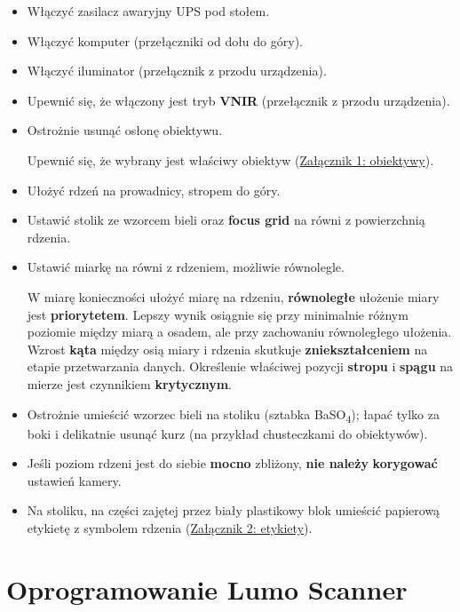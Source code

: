 \documentclass[
  letterpaper,
  DIV=11,
  numbers=noendperiod]{scrreprt}
\begin{document}
\begin{itemize}
\item
  Włączyć zasilacz awaryjny UPS pod stołem.
\item
  Włączyć komputer (przełączniki od dołu do góry).
\item
  Włączyć iluminator (przełącznik z przodu urządzenia).
\item
  Upewnić się, że włączony jest tryb \textbf{VNIR} (przełącznik z przodu
  urządzenia).
\item
  Ostrożnie usunąć osłonę obiektywu.

  Upewnić się, że wybrany jest właściwy obiektyw
  (\protect\hyperlink{zaux142ux105cznik-1-obiektywy}{Załącznik 1:
  obiektywy}).
\item
  Ułożyć rdzeń na prowadnicy, stropem do góry.
\item
  Ustawić stolik ze wzorcem bieli oraz \textbf{focus grid} na równi z
  powierzchnią rdzenia.
\item
  Ustawić miarkę na równi z rdzeniem, możliwie równolegle.

  W miarę konieczności ułożyć miarę na rdzeniu, \textbf{równoległe}
  ułożenie miary jest \textbf{priorytetem}. Lepszy wynik osiągnie się
  przy minimalnie różnym poziomie między miarą a osadem, ale przy
  zachowaniu równoległego ułożenia. Wzrost \textbf{kąta} między osią
  miary i rdzenia skutkuje \textbf{zniekształceniem} na etapie
  przetwarzania danych. Określenie właściwej pozycji \textbf{stropu} i
  \textbf{spągu} na mierze jest czynnikiem \textbf{krytycznym}.
\item
  Ostrożnie umieścić wzorzec bieli na stoliku (sztabka
  BaSO\textsubscript{4}); łapać tylko za boki i delikatnie usunąć kurz
  (na przykład chusteczkami do obiektywów).
\item
  Jeśli poziom rdzeni jest do siebie \textbf{mocno} zbliżony,
  \textbf{nie należy} \textbf{korygować} ustawień kamery.
\item
  Na stoliku, na części zajętej przez biały plastikowy blok umieścić
  papierową etykietę z symbolem rdzenia
  (\protect\hyperlink{zaux142ux105cznik-2-etykiety}{Załącznik 2:
  etykiety}).
\end{itemize}

\hypertarget{oprogramowanie-lumo-scanner}{%
\section{Oprogramowanie Lumo
Scanner}\label{oprogramowanie-lumo-scanner}}
\end{document}

